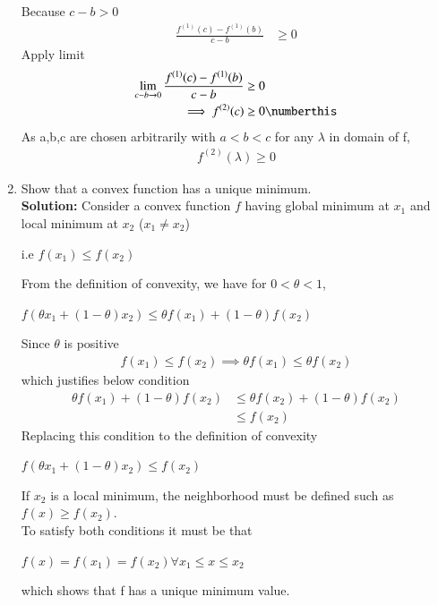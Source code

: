 \begin{enumerate}[label=\arabic*.,ref=\thesection.\theenumi]
Because $c-b > 0$
\begin{align*}
    \frac{f^{(1)}(c) - f^{(1)}(b)}{c-b} &\geq 0
\end{align*}  
%
Apply limit
\begin{align*}  
    \lim_{c-b\to 0} \frac{f^{(1)}(c) - f^{(1)}(b)}{c-b} & \geq 0\\
    \implies f^{(2)}(c) & \geq 0 \numberthis 
\end{align*} 
%
As a,b,c are chosen arbitrarily with $a<b<c$ for any $\lambda$ in domain of f,\\
\begin{align}
{f^{(2)}(\lambda) \geq 0}
\end{align}
%
%
%
\item Show that a convex function has a unique minimum.\\
%
\textbf{Solution:}
Consider a convex function $f$ having global minimum at $x_1$ and local minimum at $x_2$ ($x_1\neq x_2$)
\begin{center}
    i.e $f(x_1)\leq f(x_2)$
\end{center}
From the definition of convexity, we have for $0< \theta<1$,
\begin{center}
    $f(\theta x_1+(1 - \theta)x_2) \leq \theta f(x_1)+(1 - \theta)f(x_2) $
\end{center}
Since $\theta$ is positive
\begin{equation} 
\begin{split}
    f(x_1)\leq f(x_2)\implies\theta f(x_1)\leq \theta f(x_2)
\end{split}
\end{equation}
which justifies below condition
\begin{equation} \label{eq1}
\begin{split}
    \theta f(x_1)+(1-\theta)f(x_2) &\leq \theta f(x_2)+(1-\theta)f(x_2)\\
    &\leq f(x_2)
\end{split}
\end{equation}
Replacing this condition to the definition of convexity
\begin{center}
    $f(\theta x_1+(1-\theta)x_2) \leq f(x_2)$
\end{center}
If $x_2$ is a local minimum, the neighborhood must be defined such as $f(x)\geq f(x_2)$.\\
To satisfy both conditions it must be that 
\begin{center}
    $f(x) = f(x_1) = f(x_2) \forall x_1\leq x\leq x_2 $
\end{center}
which shows that f has a unique minimum value.
%
\end{enumerate}
%
